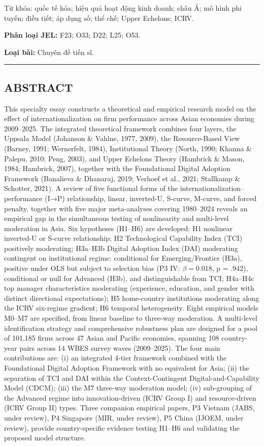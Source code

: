 \documentclass[12pt,a4paper]{article}
\begin{document}
Từ khóa: quốc tế hóa; hiệu quả hoạt động kinh doanh; châu Á; mô hình phi
tuyến; điều tiết; áp dụng số; thể chế; Upper Echelons; ICRV.

\textbf{Phân loại JEL:} F23; O33; D22; L25; O53.

\textbf{Loại bài:} Chuyên đề tiến sĩ.

\begin{center}\rule{0.5\linewidth}{0.5pt}\end{center}

\hypertarget{abstract}{%
\subsection{ABSTRACT}\label{abstract}}

This specialty essay constructs a theoretical and empirical research
model on the effect of internationalization on firm performance across
Asian economies during 2009--2025. The integrated theoretical framework
combines four layers, the Uppsala Model (Johanson \& Vahlne, 1977,
2009), the Resource-Based View (Barney, 1991; Wernerfelt, 1984),
Institutional Theory (North, 1990; Khanna \& Palepu, 2010; Peng, 2003),
and Upper Echelons Theory (Hambrick \& Mason, 1984; Hambrick, 2007),
together with the Foundational Digital Adoption Framework (Banalieva \&
Dhanaraj, 2019; Verhoef et al., 2021; Stallkamp \& Schotter, 2021). A
review of five functional forms of the internationalization--performance
(I→P) relationship, linear, inverted-U, S-curve, M-curve, and forced
penalty, together with five major meta-analyses covering 1980--2024
reveals an empirical gap in the simultaneous testing of nonlinearity and
multi-level moderation in Asia. Six hypotheses (H1--H6) are developed:
H1 nonlinear inverted-U or S-curve relationship; H2 Technological
Capability Index (TCI) positively moderating; H3a--H3b Digital Adoption
Index (DAI) moderating contingent on institutional regime: conditional
for Emerging/Frontier (H3a), positive under OLS but subject to selection
bias (P3 IV: \(\beta = 0.018\), p = .942), conditional or null for
Advanced (H3b), and distinguishable from TCI; H4a--H4c top manager
characteristics moderating (experience, education, and gender with
distinct directional expectations); H5 home-country institutions
moderating along the ICRV six-regime gradient; H6 temporal
heterogeneity. Eight empirical models M0--M7 are specified, from linear
baseline to three-way moderation. A multi-level identification strategy
and comprehensive robustness plan are designed for a pool of 101,185
firms across 47 Asian and Pacific economies, spanning 108 country-year
pairs across 14 WBES survey waves (2009--2025). The four main
contributions are: (i) an integrated 4-tier framework combined with the
Foundational Digital Adoption Framework with no equivalent for Asia;
(ii) the separation of TCI and DAI within the Context-Contingent
Digital-and-Capability Model (CDCM); (iii) the M7 three-way moderation
model; (iv) sub-grouping of the Advanced regime into innovation-driven
(ICRV Group I) and resource-driven (ICRV Group II) types. Three
companion empirical papers, P3 Vietnam (JABS, under review), P4
Singapore (MIR, under review), P5 China (IJOEM, under review), provide
country-specific evidence testing H1--H6 and validating the proposed
model structure.
\end{document}
